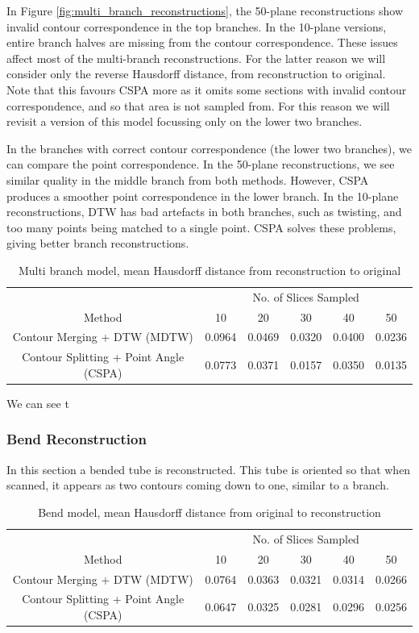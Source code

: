 \documentclass[11p, titlepage]{article}
\begin{document}
In Figure \ref{fig:multi_branch_reconstructions}, the 50-plane reconstructions show invalid contour correspondence in the top branches. In the 10-plane versions, entire branch halves are missing from the contour correspondence. These issues affect most of the multi-branch reconstructions. For the latter reason we will consider only the reverse Hausdorff distance, from reconstruction to original. Note that this favours CSPA more as it omits some sections with invalid contour correspondence, and so that area is not sampled from. For this reason we will revisit a version of this model focussing only on the lower two branches.

In the branches with correct contour correspondence (the lower two branches), we can compare the point correspondence. In the 50-plane reconstructions, we see similar quality in the middle branch from both methods. However, CSPA produces a smoother point correspondence in the lower branch. In the 10-plane reconstructions, DTW has bad artefacts in both branches, such as twisting, and too many points being matched to a single point. CSPA solves these problems, giving better branch reconstructions.

\begin{table}[h]
\begin{tabular}{ | c | c | c | c | c | c | }
\hline
& \multicolumn{5}{c|}{No. of Slices Sampled} \\
\cline{2-6}
Method & 10 & 20 & 30 & 40 & 50 \\
\hline
Contour Merging + DTW (MDTW) & 0.0964 & 0.0469 & 0.0320 & 0.0400 & 0.0236 \\
Contour Splitting + Point Angle (CSPA) & 0.0773 & 0.0371 & 0.0157 & 0.0350 & 0.0135 \\
\hline
\end{tabular}
\caption{Multi branch model, mean Hausdorff distance from reconstruction to original}
\label{table:multi_branch_reverse}
\end{table}

We can see t

\subsubsection{Bend Reconstruction}

In this section a bended tube is reconstructed. This tube is oriented so that when scanned, it appears as two contours coming down to one, similar to a branch.

\begin{table}[h]
\begin{tabular}{ | c | c | c | c | c | c | }
\hline
& \multicolumn{5}{c|}{No. of Slices Sampled} \\
\cline{2-6}
Method & 10 & 20 & 30 & 40 & 50 \\
\hline
Contour Merging + DTW (MDTW) & 0.0764 & 0.0363 & 0.0321 & 0.0314 & 0.0266 \\
Contour Splitting + Point Angle (CSPA) & 0.0647 & 0.0325 & 0.0281 & 0.0296 & 0.0256 \\
\hline
\end{tabular}
\caption{Bend model, mean Hausdorff distance from original to reconstruction}
\label{table:bend_forward}
\end{table}
\end{document}
